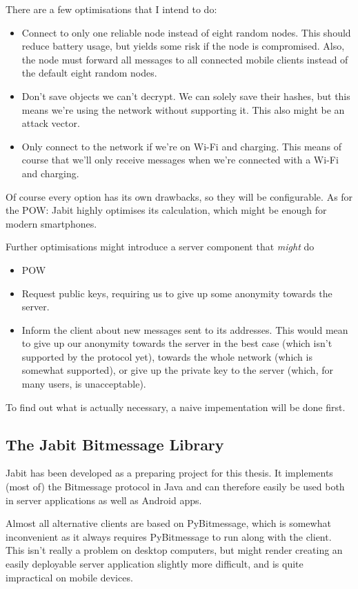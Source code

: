 \documentclass{bfh}
\begin{document}
  There are a few optimisations that I intend to do:
  \begin{itemize}
    \item Connect to only one reliable node instead of eight random nodes. This should reduce battery usage, but yields some risk if the node is compromised. Also, the node must forward all messages to all connected mobile clients instead of the default eight random nodes.
    \item Don't save objects we can't decrypt. We can solely save their hashes, but this means we're using the network without supporting it. This also might be an attack vector.
    \item Only connect to the network if we're on Wi-Fi and charging. This means of course that we'll only receive messages when we're connected with a Wi-Fi and charging.
  \end{itemize}
  Of course every option has its own drawbacks, so they will be configurable. As for the \ac{POW}: Jabit highly optimises its calculation, which might be enough for modern smartphones.

  Further optimisations might introduce a server component that \textit{might} do
  \begin{itemize}
    \item \acl{POW}
    \item Request public keys, requiring us to give up some anonymity towards the server.
    \item Inform the client about new messages sent to its addresses. This would mean to give up our anonymity towards the server in the best case (which isn't supported by the protocol yet), towards the whole network (which is somewhat supported), or give up the private key to the server (which, for many users, is unacceptable).
  \end{itemize}

  To find out what is actually necessary, a naive impementation will be done first.

  \subsection{The Jabit Bitmessage Library}
  Jabit has been developed as a preparing project for this thesis. It implements (most of) the Bitmessage protocol in Java and can therefore easily be used both in server applications as well as Android apps.

  Almost all alternative clients are based on PyBitmessage, which is somewhat inconvenient as it always requires PyBitmessage to run along with the client. This isn't really a problem on desktop computers, but might render creating  an easily deployable server application slightly more difficult, and is quite impractical on mobile devices.
\end{document}
